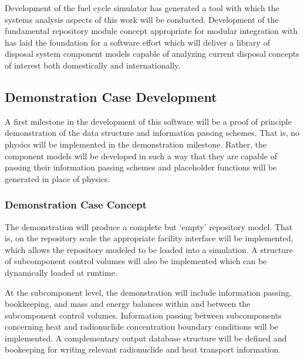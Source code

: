 Development of the \Cyclus fuel cycle simulator has generated a tool with which 
the systems analysis aspects of this work will be conducted. Development of the  
fundamental repository module concept appropriate for modular integration with 
\Cyclus has laid the foundation for a software effort which will deliver a 
library of disposal system component models capable of analyzing current 
disposal concepts of interest both domestically and internationally.

\subsection{Demonstration Case Development}


A first milestone in the development of this software will be a  proof of 
principle demonstration of the data structure and information passing schemes.  
That is, no physics will be implemented in the demonstration milestone. Rather, 
the component models will be developed in such a way that they are capable of 
passing their information passing schemes and placeholder functions will be 
generated in place of physics.

\subsubsection{Demonstration Case Concept}





  The demonstration will produce a complete but `empty' repository model. That 
  is, on the repository scale the appropriate facility interface will be 
  implemented, which allows the repository modeled to be loaded into a \Cyclus 
  simulation. A structure of subcomponent control volumes will also be 
  implemented which can be dynamically loaded at runtime.




  At the subcomponent level, the demonstration will include information passing,
  bookkeeping, and mass and energy balances within and between the subcomponent 
  control volumes.  Information passing between subcomponents concerning heat 
  and radionuclide concentration boundary conditions will be implemented. A 
  complementary output database structure will be defined and bookeeping for 
  writing relevant radionuclide and heat transport information.  

